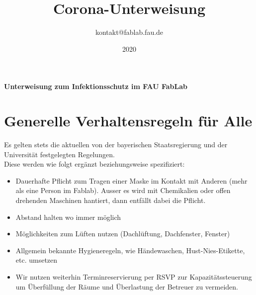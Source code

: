 \documentclass[13pt]{\basedir/fablab-document}
\date{2020}
\author{kontakt@fablab.fau.de}
\title{Corona-Unterweisung}
\begin{document}
\maketitle

\begin{center}
  \textbf{Unterweisung zum Infektionsschutz im FAU FabLab}
\end{center}

\vbox{\vspace{1cm}}

\section{Generelle Verhaltensregeln für Alle}
Es gelten stets die aktuellen von der bayerischen Staatsregierung und der Universität festgelegten Regelungen. \\
Diese werden wie folgt ergänzt beziehungsweise spezifiziert: 

\begin{itemize}
  \item  Dauerhafte Pflicht zum Tragen einer Maske im Kontakt mit Anderen (mehr als eine Person im Fablab). Ausser es wird mit Chemikalien oder offen drehenden Maschinen hantiert, dann entfällt dabei die Pflicht.
  \item  Abstand halten wo immer möglich
  \item  Möglichkeiten zum Lüften nutzen (Dachlüftung, Dachfenster, Fenster)
  \item  Allgemein bekannte Hygieneregeln, wie Händewaschen, Hust-Nies-Etikette, etc. umsetzen
  \item  Wir nutzen weiterhin Terminreservierung per RSVP zur Kapazitätssteuerung um Überfüllung der Räume und Überlastung der Betreuer zu vermeiden.
\end{itemize}


\end{document}
